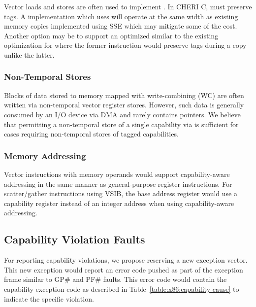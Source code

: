 Vector loads and stores are often used to implement .
In CHERI C,  must preserve tags.  A 
implementation which uses  will operate at the same
width as existing memory copies implemented using SSE which may
mitigate some of the cost.  Another option may be to support an
optimized  similar to the existing optimization
for  where the former instruction would preserve
tags during a copy unlike the latter.

\subsubsection{Non-Temporal Stores}

Blocks of data stored to memory mapped with write-combining (WC) are
often written via non-temporal vector register stores.  However, such
data is generally consumed by an I/O device via DMA and rarely
contains pointers.  We believe that permitting a non-temporal store of
a single capability via  is sufficient for cases
requiring non-temporal stores of tagged capabilities.

\subsubsection{Memory Addressing}

Vector instructions with memory operands would support
capability-aware addressing in the same manner as general-purpose
register instructions.  For scatter/gather instructions using VSIB,
the base address register would use a capability register instead of
an integer address when using capability-aware addressing.

\subsection{Capability Violation Faults}
\label{sec:x86:capability-fault}

For reporting capability violations, we propose reserving a new
exception vector.  This new exception would report an error code
pushed as part of the exception frame similar to GP\# and PF\# faults.
This error code would contain the capability exception code as
described in Table~\ref{table:x86:capability-cause} to indicate
the specific violation.

